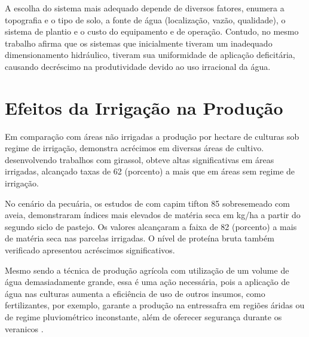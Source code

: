 A escolha do sistema mais adequado depende de diversos fatores, \cite{de2006avaliaccao} enumera a topografia e o tipo de solo, a fonte de água (localização, vazão, qualidade), o sistema de plantio e o custo do equipamento e de operação. Contudo, no mesmo trabalho afirma que os sistemas que inicialmente tiveram um inadequado dimensionamento hidráulico, tiveram sua uniformidade de aplicação deficitária, causando decréscimo na produtividade devido ao uso irracional da água.


\section{Efeitos da Irrigação na Produção}

Em comparação com áreas não irrigadas a produção por hectare de culturas sob regime de irrigação, demonstra acrécimos em diversas áreas de cultivo. \cite{sanches2013girassol} desenvolvendo trabalhos com girassol, obteve altas significativas em áreas irrigadas, alcançado taxas de 62 (porcento) a mais que em áreas sem regime de irrigação. 

No cenário da pecuária, os estudos de \cite{sanches2013tifton} com capim tifton 85   sobresemeado com aveia, demonstraram índices mais elevados de matéria seca em kg/ha a partir do segundo siclo de pastejo. Os valores alcançaram a faixa de 82 (porcento) a mais de matéria seca nas parcelas irrigadas. O nível de proteína bruta também verificado apresentou acréscimos significativos.

Mesmo sendo a técnica de produção agrícola com utilização de um volume de água demasiadamente grande, essa é uma ação necessária, pois a aplicação de água nas culturas aumenta a eficiência de uso de outros insumos, como fertilizantes, por exemplo, garante a produção na entressafra em regiões áridas ou de regime pluviométrico inconstante, além de oferecer segurança durante os veranicos \cite{de2008desenvolvimento}.
